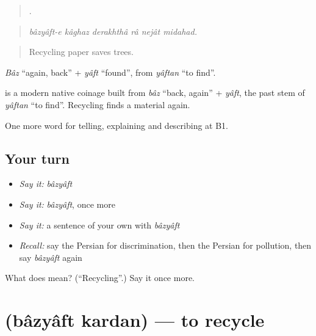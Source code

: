 \begin{quote}
     .
\end{quote}

\begin{quote}
\emph{bâzyâft-e kâghaz derakhthâ râ nejât midahad.}
\end{quote}

\begin{quote}
Recycling paper saves trees.
\end{quote}

\emph{Bâz} \textquotedblleft{}again, back\textquotedblright{} + \emph{yâft} \textquotedblleft{}found\textquotedblright{}, from \emph{yâftan} \textquotedblleft{}to find\textquotedblright{}.

\begin{cousinweb}
\textbf{} is a modern native coinage built from \emph{bâz} \textquotedblleft{}back, again\textquotedblright{} + \emph{yâft}, the past stem of \emph{yâftan} \textquotedblleft{}to find\textquotedblright{}. Recycling finds a material again.
\end{cousinweb}

\begin{grammarlens}[title={What you've built}]
One more word for telling, explaining and describing at B1.
\end{grammarlens}

\subsection*{Your turn}
\begin{itemize}
\raggedright
  \item \emph{Say it:} \emph{bâzyâft}
  \item \emph{Say it:} \emph{bâzyâft}, once more
  \item \emph{Say it:} a sentence of your own with \emph{bâzyâft}
  \item \emph{Recall:} say the Persian for discrimination, then the Persian for pollution, then say \emph{bâzyâft} again
\end{itemize}

\begin{tcolorbox}[breakable,colback=teal!4,colframe=teal!35!black,title={Before you move on}]
What does  mean? (\textquotedblleft{}Recycling\textquotedblright{}.) Say it once more.
\end{tcolorbox}
\section[\texorpdfstring{\fa{بازیافت} \fa{کردن} (bâzyâft kardan)}{بازیافت کردن (bâzyâft kardan)}]{  (bâzyâft kardan) — to recycle}

